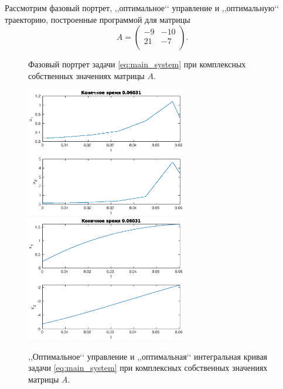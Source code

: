 Рассмотрим фазовый портрет, ,,оптимальное‘‘ управление и ,,оптимальную‘‘ траекторию, построенные программой для матрицы
$$
        A =
        \begin{pmatrix}
        -9 & -10 \\
        21 & -7 \\
        \end{pmatrix}.
$$
\begin{figure}[h]
\noindent{}
\caption{Фазовый портрет задачи \eqref{eq:main_system} при комплексных собственных значениях матрицы $A$.}
\end{figure}

\begin{figure}[h]
                \hfill
                \includegraphics[width=70mm]{program/complex-control.eps}
                \hfill
                \hfill
                \includegraphics[width=70mm]{program/complex-traectory.eps}
                \hfill
                \caption{,,Оптимальное‘‘ управление и ,,оптимальная‘‘ интегральная кривая задачи \eqref{eq:main_system} при комплексных собственных значениях матрицы $A$.}
\end{figure}

